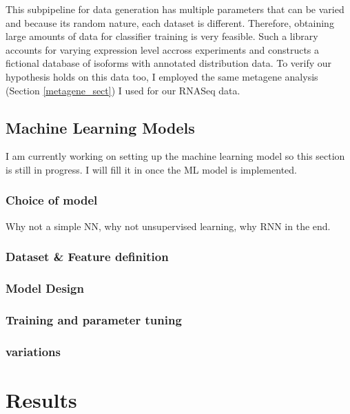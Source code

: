 \documentclass[12pt]{article}
\begin{document}
This subpipeline for data generation has multiple parameters that can be varied and because its random nature, each dataset is different. Therefore, obtaining large amounts of data for classifier training is very feasible. Such a library accounts for varying expression level accross experiments and constructs a fictional database of isoforms with annotated distribution data. To verify our hypothesis holds on this data too, I employed the same metagene analysis (Section \ref{metagene_sect}) I used for our RNASeq data.  

\subsection{Machine Learning Models}
I am currently working on setting up the machine learning model so this section is still in progress. I will fill it in once the ML model is implemented. 
\subsubsection{Choice of model}
Why not a simple NN, why not unsupervised learning, why RNN in the end. 
\subsubsection{Dataset \& Feature definition}
\subsubsection{Model Design}
\subsubsection{Training and parameter tuning}
\subsubsection{variations}




\section{Results}\label{res}
\end{document}

